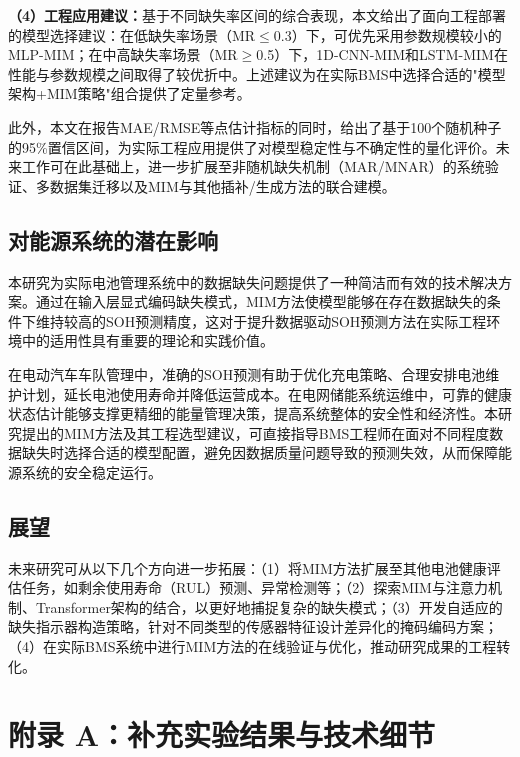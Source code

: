 \documentclass[10pt,a4paper]{ctexart}
\begin{document}
\textbf{（4）工程应用建议：}基于不同缺失率区间的综合表现，本文给出了面向工程部署的模型选择建议：在低缺失率场景（MR$\leq$0.3）下，可优先采用参数规模较小的MLP-MIM；在中高缺失率场景（MR$\geq$0.5）下，1D-CNN-MIM和LSTM-MIM在性能与参数规模之间取得了较优折中。上述建议为在实际BMS中选择合适的"模型架构+MIM策略"组合提供了定量参考。

此外，本文在报告MAE/RMSE等点估计指标的同时，给出了基于100个随机种子的95\%置信区间，为实际工程应用提供了对模型稳定性与不确定性的量化评价。未来工作可在此基础上，进一步扩展至非随机缺失机制（MAR/MNAR）的系统验证、多数据集迁移以及MIM与其他插补/生成方法的联合建模。

\subsection{对能源系统的潜在影响}

本研究为实际电池管理系统中的数据缺失问题提供了一种简洁而有效的技术解决方案。通过在输入层显式编码缺失模式，MIM方法使模型能够在存在数据缺失的条件下维持较高的SOH预测精度，这对于提升数据驱动SOH预测方法在实际工程环境中的适用性具有重要的理论和实践价值。

在电动汽车车队管理中，准确的SOH预测有助于优化充电策略、合理安排电池维护计划，延长电池使用寿命并降低运营成本。在电网储能系统运维中，可靠的健康状态估计能够支撑更精细的能量管理决策，提高系统整体的安全性和经济性。本研究提出的MIM方法及其工程选型建议，可直接指导BMS工程师在面对不同程度数据缺失时选择合适的模型配置，避免因数据质量问题导致的预测失效，从而保障能源系统的安全稳定运行。

\subsection{展望}

未来研究可从以下几个方向进一步拓展：（1）将MIM方法扩展至其他电池健康评估任务，如剩余使用寿命（RUL）预测、异常检测等；（2）探索MIM与注意力机制、Transformer架构的结合，以更好地捕捉复杂的缺失模式；（3）开发自适应的缺失指示器构造策略，针对不同类型的传感器特征设计差异化的掩码编码方案；（4）在实际BMS系统中进行MIM方法的在线验证与优化，推动研究成果的工程转化。




\appendix
\section{附录 A：补充实验结果与技术细节}
\end{document}

